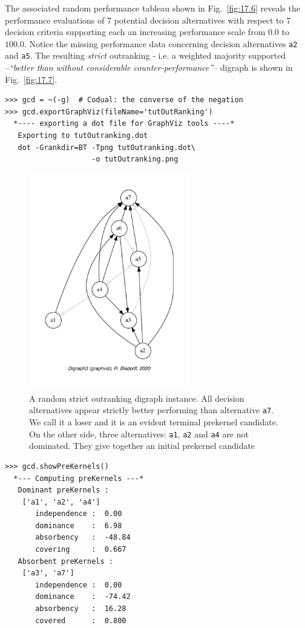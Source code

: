 The associated random performance tableau shown in Fig.~\vref{fig:17.6} reveals the performance evaluations of 7 potential decision alternatives with respect to 7 decision criteria supporting each an increasing performance scale from $0.0$ to $100.0$. Notice the missing performance data concerning decision alternatives \texttt{a2} and \texttt{a5}. The resulting \emph{strict} outranking - i.e. a weighted majority supported --\emph{``better than without considerable counter-performance''}-- digraph is shown in Fig.~\vref{fig:17.7}.
\begin{lstlisting}
>>> gcd = ~(-g)  # Codual: the converse of the negation
>>> gcd.exportGraphViz(fileName='tutOutRanking')
  *---- exporting a dot file for GraphViz tools ----*
   Exporting to tutOutranking.dot
   dot -Grankdir=BT -Tpng tutOutranking.dot\
                    -o tutOutranking.png\end{lstlisting}
\begin{figure}[ht]
\sidecaption[t]
\includegraphics[width=7cm]{Figures/17-7-tutOutranking.pdf}
\caption{A random strict outranking digraph instance. All decision alternatives appear strictly better performing than alternative \texttt{a7}. We call it a \Condorcet loser and it is an evident terminal prekernel candidate. On the other side, three alternatives: \texttt{a1}, \texttt{a2} and \texttt{a4} are not dominated. They give together an initial prekernel candidate}
\label{fig:17.7}       %
\end{figure}

\begin{lstlisting}[caption={Computing the prekernels of the strict outranking digraph \texttt{gcd}},label=list:17.13]
>>> gcd.showPreKernels()
  *--- Computing preKernels ---*
   Dominant preKernels :
    ['a1', 'a2', 'a4']
       independence :  0.00
       dominance    :  6.98
       absorbency   :  -48.84
       covering     :  0.667
   Absorbent preKernels :
    ['a3', 'a7']
       independence :  0.00
       dominance    :  -74.42
       absorbency   :  16.28
       covered      :  0.800
\end{lstlisting}

